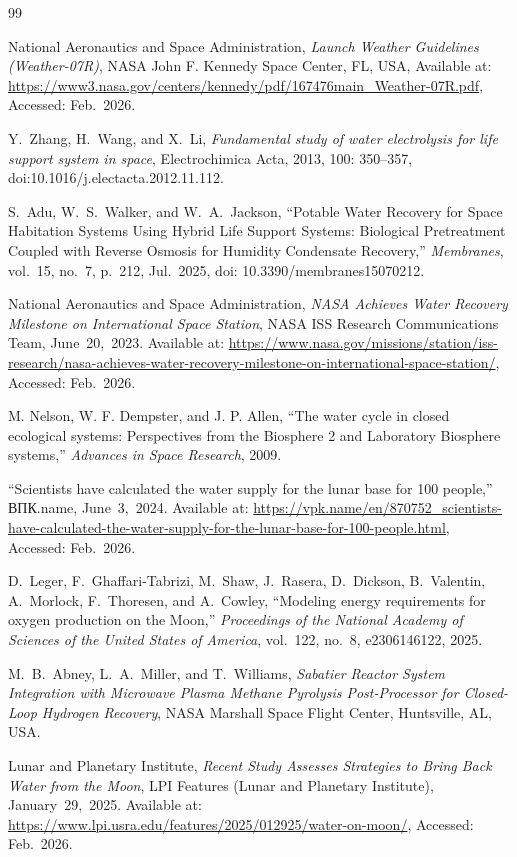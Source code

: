 \begin{thebibliography}{99}


National Aeronautics and Space Administration,
\emph{Launch Weather Guidelines (Weather-07R)},
NASA John F. Kennedy Space Center, FL, USA,
Available at: \url{https://www3.nasa.gov/centers/kennedy/pdf/167476main_Weather-07R.pdf},
Accessed: Feb.~2026.

Y.~Zhang, H.~Wang, and X.~Li,
\emph{Fundamental study of water electrolysis for life support system in space},
Electrochimica Acta,
2013, 100: 350--357,
doi:10.1016/j.electacta.2012.11.112.

S.~Adu, W.~S.~Walker, and W.~A.~Jackson,
``Potable Water Recovery for Space Habitation Systems Using Hybrid Life Support Systems:
Biological Pretreatment Coupled with Reverse Osmosis for Humidity Condensate Recovery,''
\emph{Membranes}, vol.~15, no.~7, p.~212, Jul.~2025,
doi: 10.3390/membranes15070212.

National Aeronautics and Space Administration,
\emph{NASA Achieves Water Recovery Milestone on International Space Station},
NASA ISS Research Communications Team, June~20,~2023.
Available at: \url{https://www.nasa.gov/missions/station/iss-research/nasa-achieves-water-recovery-milestone-on-international-space-station/},
Accessed: Feb.~2026.

M. Nelson, W. F. Dempster, and J. P. Allen,
``The water cycle in closed ecological systems: Perspectives from the
Biosphere 2 and Laboratory Biosphere systems,''
\emph{Advances in Space Research},
2009.

“Scientists have calculated the water supply for the lunar base for 100 people,” 
ВПК.name, June~3,~2024.
Available at: \url{https://vpk.name/en/870752_scientists-have-calculated-the-water-supply-for-the-lunar-base-for-100-people.html},
Accessed: Feb.~2026.

D.~Leger, F.~Ghaffari-Tabrizi, M.~Shaw, J.~Rasera, D.~Dickson, B.~Valentin,
A.~Morlock, F.~Thoresen, and A.~Cowley,
``Modeling energy requirements for oxygen production on the Moon,''
\emph{Proceedings of the National Academy of Sciences of the United States of America},
vol.~122, no.~8, e2306146122, 2025.

M.~B.~Abney, L.~A.~Miller, and T.~Williams,
\emph{Sabatier Reactor System Integration with Microwave Plasma Methane Pyrolysis Post-Processor for Closed-Loop Hydrogen Recovery},
NASA Marshall Space Flight Center, Huntsville, AL, USA.

Lunar and Planetary Institute,
\emph{Recent Study Assesses Strategies to Bring Back Water from the Moon},
LPI Features (Lunar and Planetary Institute), January~29,~2025.
Available at: \url{https://www.lpi.usra.edu/features/2025/012925/water-on-moon/},
Accessed: Feb.~2026.

\end{thebibliography}
